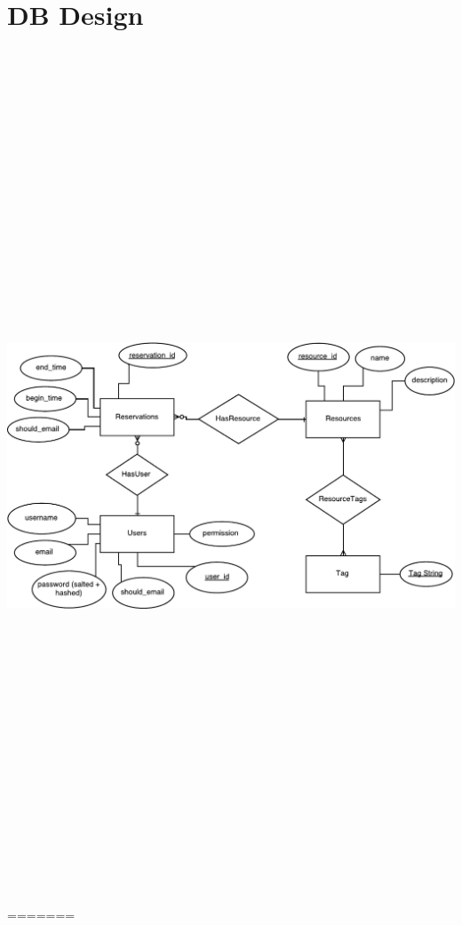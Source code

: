 \documentclass[12pt]{article}
\begin{document}
\section{DB Design}
\label{appendix:DBDesign}
\includegraphics[height=10in]{Evolution1DB.pdf}
=======
\end{document}
